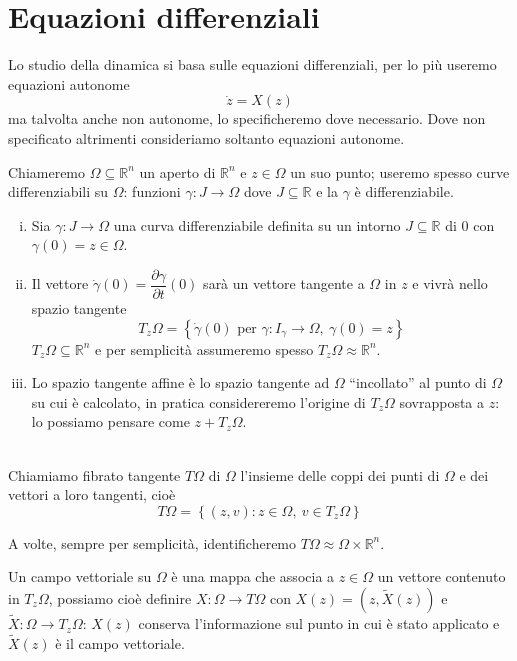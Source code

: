 \documentclass[11pt,a4paper,twoside]{book}
\newenvironment{definizione}[1][\empty]{\begin{Definizione}{
\ifx\empty#1\relax\else\mdseries\itshape#1\\\fi
}{}}{\end{Definizione}}
\theoremstyle{esss}
\theoremstyle{dotless}
\numberwithin{equation}{section} %
\begin{document}
\section{Equazioni differenziali}
Lo studio della dinamica si basa sulle equazioni differenziali, per lo più useremo equazioni autonome
\[
\dot{z}=X(z)
\]
ma talvolta anche non autonome, lo specificheremo dove necessario. Dove non specificato altrimenti consideriamo soltanto equazioni autonome.
 
Chiameremo $\Omega \subseteq \mathbb{R}^n $ un aperto di $\mathbb{R}^n$ e $ z\in\Omega $ un suo punto; useremo spesso curve differenziabili su $\Omega$: funzioni $\gamma:J\rightarrow\Omega$ dove $J\subseteq\mathbb{R}$ e la $\gamma$ è differenziabile.

\begin{enumerate}[i.]
\item Sia $\gamma:J\rightarrow\Omega$ una curva differenziabile definita su un intorno $J\subseteq \mathbb{R}$ di $0$ con $\gamma(0)=z\in\Omega$.
\item Il vettore $\dot{\gamma}(0)= \dfrac{\partial\gamma}{\partial t}(0)$ sarà un vettore tangente a $\Omega$ in $z$ e vivrà nello spazio tangente
\[
T_z\Omega= \left\{ \dot{\gamma}(0) \text{ per } \gamma:I_\gamma\rightarrow\Omega , \> \gamma(0)=z  \right\}
\]
$T_z\Omega\subseteq\mathbb{R}^n$ e per semplicità assumeremo spesso $T_z\Omega \approx \mathbb{R}^n$.

\item Lo spazio tangente affine è lo spazio tangente ad $\Omega$ ``incollato'' al punto di $\Omega$ su cui è calcolato, in pratica considereremo l'origine di $T_z\Omega$ sovrapposta a $z$: lo possiamo pensare come $z+T_z\Omega$.
\end{enumerate}

\begin{definizione}
Chiamiamo fibrato tangente $T\Omega$ di $\Omega$ l'insieme delle coppi dei punti di $\Omega$ e dei vettori a loro tangenti, cioè
\[
T\Omega=\left\{ (z,v) : z\in\Omega , \> v\in T_z\Omega   \right\}
\]
\end{definizione}

A volte, sempre per semplicità, identificheremo $T\Omega \approx \Omega \times \mathbb{R}^n$.

Un campo vettoriale su $\Omega$ è una mappa che associa a  $z\in\Omega$ un vettore contenuto in $T_z\Omega$, possiamo cioè definire $X:\Omega\rightarrow T\Omega$ con $X(z)=(z,\tilde{X}(z))$ e $\tilde{X}:\Omega\rightarrow T_z\Omega$: $X(z)$ conserva l'informazione sul punto in cui è stato applicato e $\tilde{X}(z)$ è il campo vettoriale.
\end{document}

